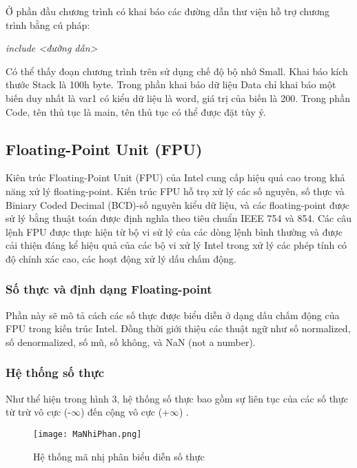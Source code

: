 		Ở phần đầu chương trình có khai báo các đường dẫn thư viện hỗ trợ chương trình bằng cú pháp:
		\begin{center}
			\textit { include <đường dẫn>} \\
		\end{center}
	Có thể thấy đoạn chương trình trên sử dụng chế độ bộ nhớ Small. Khai báo kích thước Stack là 100h byte. Trong phần khai báo dữ liệu Data chỉ khai báo một biến duy nhất là var1 có kiểu dữ liệu là word, giá trị của biến là 200. Trong phần Code, tên thủ tục là main, tên thủ tục có thể được đặt tùy ý.\\


	\subsection{Floating-Point Unit (FPU)}
	Kiên trúc Floating-Point Unit (FPU) của Intel cung cấp hiệu quả cao trong khả năng xử lý floating-point. Kiến trúc FPU hỗ trọ xử lý các số nguyên, số thực và Biniary Coded Decimal (BCD)-số nguyên kiểu dữ liệu, và các floating-point được sử lý bằng thuật toán được định nghĩa theo tiêu chuẩn IEEE 754 và 854. Các câu lệnh FPU được thực hiện từ bộ vi sử lý của các dòng lệnh bình thường và được cải thiện đáng kể hiệu quả của các bộ vi xử lý Intel trong xử lý các phép tính có độ chính xác cao, các hoạt động xử lý dấu chấm động.\\
		\subsubsection{Số thực và định dạng Floating-point}	
		Phần này sẽ mô tả cách các số thực được biểu diễn ở dạng dấu chấm động của FPU trong kiến trúc Intel. Đồng thời giới thiệu các thuật ngữ như số normalized, số denormalized, số mũ, số không, và NaN (not a number). 
		
		\subsubsection*{Hệ thống số thực}
		Như thể hiện trong hình 3, hệ thống số thực bao gồm sự liên tục của các số thực từ trừ vô cực (-$\mathbb{\infty}$)  đến cộng vô cực (+$\mathbb{\infty}$) .\\
		\begin{center}
			\begin{figure}[htp]
				\begin{center}
					\texttt{[image: MaNhiPhan.png]}
				\end{center}
				\caption{Hệ thống mã nhị phân biểu diễn số thực}				
			\end{figure}
		\end{center}		
		
